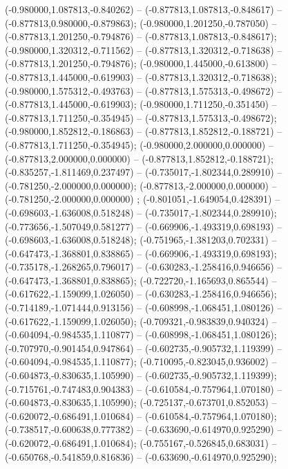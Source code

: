  (-0.980000,1.087813,-0.840262) -- (-0.877813,1.087813,-0.848617) -- (-0.877813,0.980000,-0.879863);
 (-0.980000,1.201250,-0.787050) -- (-0.877813,1.201250,-0.794876) -- (-0.877813,1.087813,-0.848617);
 (-0.980000,1.320312,-0.711562) -- (-0.877813,1.320312,-0.718638) -- (-0.877813,1.201250,-0.794876);
 (-0.980000,1.445000,-0.613800) -- (-0.877813,1.445000,-0.619903) -- (-0.877813,1.320312,-0.718638);
 (-0.980000,1.575312,-0.493763) -- (-0.877813,1.575313,-0.498672) -- (-0.877813,1.445000,-0.619903);
 (-0.980000,1.711250,-0.351450) -- (-0.877813,1.711250,-0.354945) -- (-0.877813,1.575313,-0.498672);
 (-0.980000,1.852812,-0.186863) -- (-0.877813,1.852812,-0.188721) -- (-0.877813,1.711250,-0.354945);
 (-0.980000,2.000000,0.000000) -- (-0.877813,2.000000,0.000000) -- (-0.877813,1.852812,-0.188721);
 (-0.835257,-1.811469,0.237497) -- (-0.735017,-1.802344,0.289910) -- (-0.781250,-2.000000,0.000000);
 (-0.877813,-2.000000,0.000000) -- (-0.781250,-2.000000,0.000000) ;
 (-0.801051,-1.649054,0.428391) -- (-0.698603,-1.636008,0.518248) -- (-0.735017,-1.802344,0.289910);
 (-0.773656,-1.507049,0.581277) -- (-0.669906,-1.493319,0.698193) -- (-0.698603,-1.636008,0.518248);
 (-0.751965,-1.381203,0.702331) -- (-0.647473,-1.368801,0.838865) -- (-0.669906,-1.493319,0.698193);
 (-0.735178,-1.268265,0.796017) -- (-0.630283,-1.258416,0.946656) -- (-0.647473,-1.368801,0.838865);
 (-0.722720,-1.165693,0.865544) -- (-0.617622,-1.159099,1.026050) -- (-0.630283,-1.258416,0.946656);
 (-0.714189,-1.071444,0.913156) -- (-0.608998,-1.068451,1.080126) -- (-0.617622,-1.159099,1.026050);
 (-0.709321,-0.983839,0.940324) -- (-0.604094,-0.984535,1.110877) -- (-0.608998,-1.068451,1.080126);
 (-0.707970,-0.901454,0.947864) -- (-0.602735,-0.905732,1.119399) -- (-0.604094,-0.984535,1.110877);
 (-0.710095,-0.823045,0.936002) -- (-0.604873,-0.830635,1.105990) -- (-0.602735,-0.905732,1.119399);
 (-0.715761,-0.747483,0.904383) -- (-0.610584,-0.757964,1.070180) -- (-0.604873,-0.830635,1.105990);
 (-0.725137,-0.673701,0.852053) -- (-0.620072,-0.686491,1.010684) -- (-0.610584,-0.757964,1.070180);
 (-0.738517,-0.600638,0.777382) -- (-0.633690,-0.614970,0.925290) -- (-0.620072,-0.686491,1.010684);
 (-0.755167,-0.526845,0.683031) -- (-0.650768,-0.541859,0.816836) -- (-0.633690,-0.614970,0.925290);

